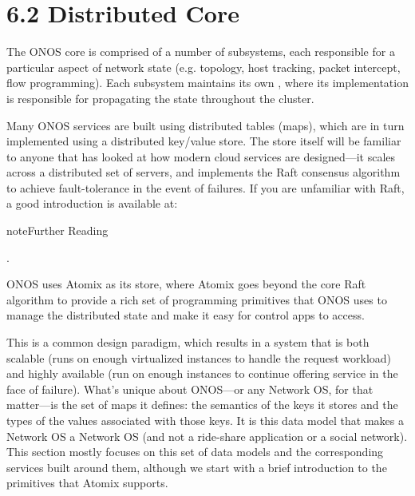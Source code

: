\documentclass[letterpaper,11pt,english]{sphinxmanual}
\begin{document}
\section{6.2 Distributed Core}
\label{\detokenize{onos:distributed-core}}
The ONOS core is comprised of a number of subsystems, each responsible
for a particular aspect of network state (e.g. topology, host
tracking, packet intercept, flow programming). Each subsystem
maintains its own , where its implementation is
responsible for propagating the state throughout the cluster.

Many ONOS services are built using distributed tables (maps), which
are in turn implemented using a distributed key/value store. The store
itself will be familiar to anyone that has looked at how modern cloud
services are designed—it scales across a distributed set of servers,
and implements the Raft consensus algorithm to achieve fault-tolerance
in the event of failures. If you are unfamiliar with Raft, a good
introduction is available at:

\label{\detokenize{onos:reading-p4}}
\begin{sphinxadmonition}{note}{Further Reading}

.
\end{sphinxadmonition}

ONOS uses Atomix as its store, where Atomix goes beyond the core Raft
algorithm to provide a rich set of programming primitives that ONOS
uses to manage the distributed state and make it easy for control apps
to access.

This is a common design paradigm, which results in a system that is
both scalable (runs on enough virtualized instances to handle the
request workload) and highly available (run on enough instances to
continue offering service in the face of failure). What’s unique about
ONOS—or any Network OS, for that matter—is the set of maps it defines:
the semantics of the keys it stores and the types of the values
associated with those keys. It is this data model that makes a Network
OS a Network OS (and not a ride-share application or a social
network).  This section mostly focuses on this set of data models and
the corresponding services built around them, although we start with a
brief introduction to the primitives that Atomix supports.
\end{document}
